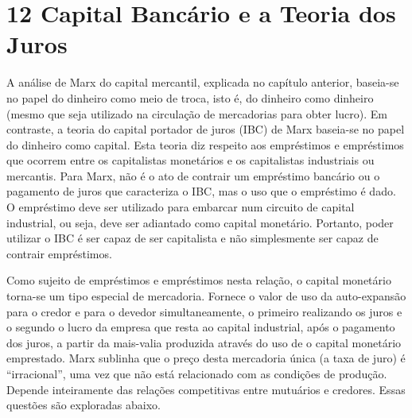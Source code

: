 \chapter{12 Capital Bancário e a Teoria dos Juros}\label{12 Capital Bancário e a Teoria dos Juros}
 \par 
A análise de Marx do capital mercantil, explicada no capítulo anterior, baseia-se no papel do dinheiro como meio de troca, isto é, do dinheiro como dinheiro (mesmo que seja utilizado na circulação de mercadorias para obter lucro). Em contraste, a teoria do capital portador de juros (IBC) de Marx baseia-se no papel do dinheiro como capital. Esta teoria diz respeito aos empréstimos e empréstimos que ocorrem entre os capitalistas monetários e os capitalistas industriais ou mercantis. Para Marx, não é o ato de contrair um empréstimo bancário ou o pagamento de juros que caracteriza o IBC, mas o uso que o empréstimo é dado. O empréstimo deve ser utilizado para embarcar num circuito de capital industrial, ou seja, deve ser adiantado como capital monetário. Portanto, poder utilizar o IBC é ser capaz de ser capitalista e não simplesmente ser capaz de contrair empréstimos.
 \par 
Como sujeito de empréstimos e empréstimos nesta relação, o capital monetário torna-se um tipo especial de mercadoria. Fornece o valor de uso da auto-expansão para o credor e para o devedor simultaneamente, o primeiro realizando os juros e o segundo o lucro da empresa que resta ao capital industrial, após o pagamento dos juros, a partir da mais-valia produzida através do uso de o capital monetário emprestado. Marx sublinha que o preço desta mercadoria única (a taxa de juro) é “irracional”, uma vez que não está relacionado com as condições de produção. Depende inteiramente das relações competitivas entre mutuários e credores. Essas questões são exploradas abaixo.
 \par 
